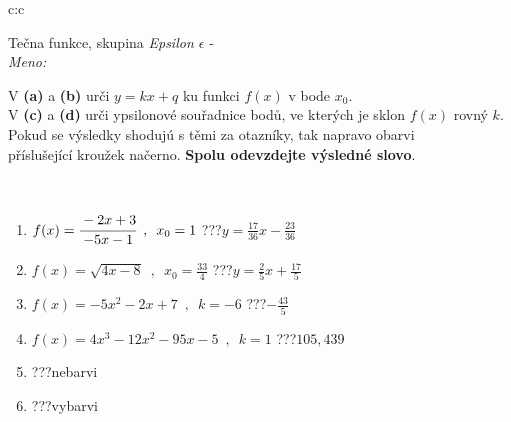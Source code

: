 \documentclass[10pt]{report}
\begin{document}
\newpage
\thispagestyle{empty}
\begin{tabular}{c:c}
\begin{minipage}[c][104.5mm][t]{0.5\linewidth}
\begin{center}
\vspace{7mm}
{\huge Tečna funkce, skupina \textit{Epsilon $\epsilon$} -}\\[5mm]
\textit{Meno:}\phantom{xxxxxxxxxxxxxxxxxxxxxxxxxxxxxxxxxxxxxxxxxxxxxxxxxxxxxxxxxxxxxxxxx}\\[5mm]
\begin{minipage}{0.95\linewidth}
\begin{center}
V \textbf{(a)} a \textbf{(b)} urči  $y = kx + q$ ku funkci $f(x)$ v bode $x_0$.\\V \textbf{(c)} a \textbf{(d)} urči ypsilonové souřadnice bodů, ve kterých je sklon $f(x)$ rovný $k$.\\Pokud se výsledky shodujú s těmi za otazníky, tak napravo obarvi\\příslušející kroužek načerno. \textbf{Spolu odevzdejte výsledné slovo}.
\end{center}
\end{minipage}
\\[1mm]
\begin{minipage}{0.79\linewidth}
\begin{center}
\begin{varwidth}{\linewidth}
\begin{enumerate}
\small
\item $f(x)=\cfrac{-2x+3}{-5x-1}\enspace , \enspace x_0=1$\quad \dotfill\; ???\;\dotfill \quad $y = \frac{17}{36}x-\frac{23}{36}$
\item $f(x)=\sqrt{4x-8}\enspace , \enspace x_0=\frac{33}{4}$\quad \dotfill\; ???\;\dotfill \quad $y = \frac{2}{5}x+\frac{17}{5}$
\item $f(x)=-5x^2-2x+7\enspace , \enspace k=-6$\quad \dotfill\; ???\;\dotfill \quad $-\frac{43}{5}$
\item $f(x)=4x^3-12x^2-95x-5\enspace , \enspace k=1$\quad \dotfill\; ???\;\dotfill \quad $105 , 439$
\item \quad \dotfill\; ???\;\dotfill \quad nebarvi
\item \quad \dotfill\; ???\;\dotfill \quad vybarvi
\end{enumerate}
\end{varwidth}
\end{center}
\end{minipage}
\begin{minipage}{0.20\linewidth}

\end{minipage}
\end{center}
\end{minipage}
\end{tabular}
\end{document}
